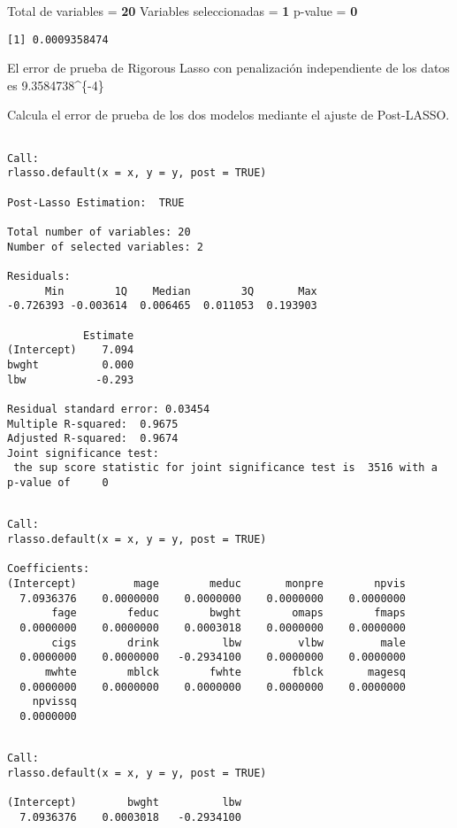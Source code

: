 \documentclass[]{article}
\begin{document}
Total de variables = \textbf{20} Variables seleccionadas = \textbf{1}
p-value = \textbf{0}

\begin{verbatim}
[1] 0.0009358474
\end{verbatim}

El error de prueba de Rigorous Lasso con penalización independiente de
los datos es 9.3584738\^{}\{-4\}

Calcula el error de prueba de los dos modelos mediante el ajuste de
Post-LASSO.

\begin{verbatim}

Call:
rlasso.default(x = x, y = y, post = TRUE)

Post-Lasso Estimation:  TRUE 

Total number of variables: 20
Number of selected variables: 2 

Residuals: 
      Min        1Q    Median        3Q       Max 
-0.726393 -0.003614  0.006465  0.011053  0.193903 

            Estimate
(Intercept)    7.094
bwght          0.000
lbw           -0.293

Residual standard error: 0.03454
Multiple R-squared:  0.9675
Adjusted R-squared:  0.9674
Joint significance test:
 the sup score statistic for joint significance test is  3516 with a p-value of     0
\end{verbatim}

\begin{verbatim}

Call:
rlasso.default(x = x, y = y, post = TRUE)

Coefficients:
(Intercept)         mage        meduc       monpre        npvis  
  7.0936376    0.0000000    0.0000000    0.0000000    0.0000000  
       fage        feduc        bwght        omaps        fmaps  
  0.0000000    0.0000000    0.0003018    0.0000000    0.0000000  
       cigs        drink          lbw         vlbw         male  
  0.0000000    0.0000000   -0.2934100    0.0000000    0.0000000  
      mwhte        mblck        fwhte        fblck       magesq  
  0.0000000    0.0000000    0.0000000    0.0000000    0.0000000  
    npvissq  
  0.0000000  
\end{verbatim}

\begin{verbatim}

Call:
rlasso.default(x = x, y = y, post = TRUE)

(Intercept)        bwght          lbw  
  7.0936376    0.0003018   -0.2934100  
\end{verbatim}
\end{document}
